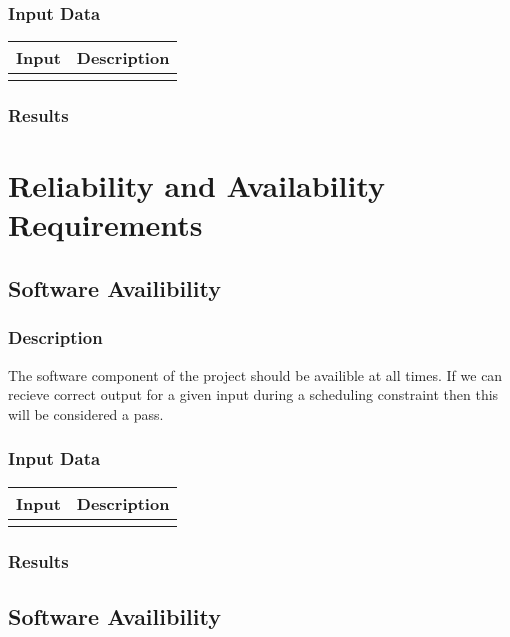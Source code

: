 \documentclass{scrreprt}
\begin{document}
\subsubsection{Input Data}
 \centering
 \begin{tabular}{p{3cm}p{6cm}}
 \hline\hline
 Input & Description\\
 \hline\hline
   &  \\ %
 \hline
 \end{tabular}
\subsubsection{Results}

\section{Reliability and Availability Requirements}
\subsection{Software Availibility}
\subsubsection{Description}
\begin{flushleft}
The software component of the project should be availible at all times. If we can recieve correct output for a given input during a scheduling constraint then this will be considered a pass.
\end{flushleft}
\subsubsection{Input Data}
 \centering
 \begin{tabular}{p{3cm}p{6cm}}
 \hline\hline
 Input & Description\\
 \hline\hline
   &  \\ %
 \hline
 \end{tabular}
\subsubsection{Results}

\subsection{Software Availibility}
\end{document}
